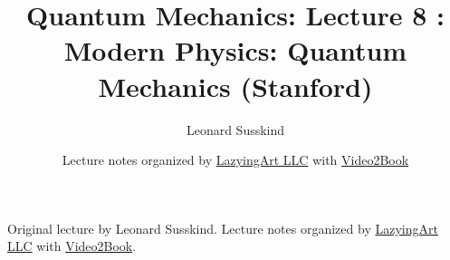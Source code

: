 \documentclass[11pt,oneside]{book}
\begin{document}
\frontmatter
\title{Quantum Mechanics: Lecture 8 : Modern Physics: Quantum Mechanics (Stanford)}
\author{Leonard Susskind}
\date{Lecture notes organized by \href{https://lazying.art}{LazyingArt LLC} with \href{https://github.com/lachlanchen/Video2Book}{Video2Book}}
\maketitle
\begin{center}
\small Original lecture by Leonard Susskind. Lecture notes organized by \href{https://lazying.art}{LazyingArt LLC} with \href{https://github.com/lachlanchen/Video2Book}{Video2Book}.
\end{center}
\clearpage
\mainmatter

\end{document}
